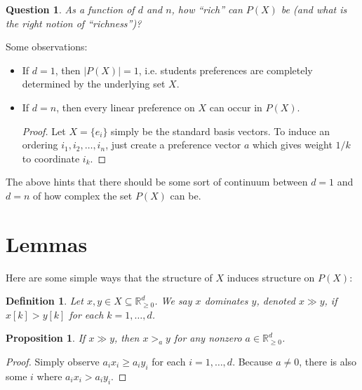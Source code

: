\documentclass[12pt]{article}
\newtheorem*{definition}{Definition}
\newtheorem*{question}{Question}
\newtheorem{proposition}[theorem]{Proposition}
\newcommand{\Rgz}{\mathbb{R}_{\ge 0}}
\newcommand{\ip}[2]{\left\langle{#1},{#2}\right\rangle}
\newcommand{\1}[1]{\mathds{1}[{#1}]}
\begin{document}


  \begin{question}
    As a function of $d$ and $n$, how ``rich'' can $P(X)$ be
    (and what is the right notion of ``richness'')?
  \end{question}

  Some observations:
  \begin{itemize}
    \item If $d=1$, then $|P(X)| = 1$, i.e. students preferences are completely
      determined by the underlying set $X$.
    \item If $d=n$, then every linear preference on $X$ can occur in $P(X)$.
      \begin{proof}
        Let $X = \{e_i\}$ simply be the standard basis vectors.
        To induce an ordering $i_1, i_2, \ldots, i_n$, just create a preference
        vector $a$ which gives weight $1/k$ to coordinate $i_k$.
      \end{proof}
  \end{itemize}
  The above hints that there should be some sort of continuum between $d=1$
  and $d=n$ of how complex the set $P(X)$ can be.

\section{Lemmas}

  Here are some simple ways that the structure of $X$ induces structure on $P(X)$:

  \begin{definition}
    Let $x,y\in X\subseteq \Rgz^d$.
    We say $x$ \emph{dominates} $y$, denoted $x\gg y$,
    if $x[k] > y[k]$ for each $k=1,\ldots,d$.
  \end{definition}
  \begin{proposition}
    If $x \gg y$, then $x >_a y$ for any nonzero $a\in \Rgz^d$.
  \end{proposition}
  \begin{proof}
    Simply observe $a_i x_i \ge a_i y_i$ for each $i=1,\ldots, d$.
    Because $a\ne 0$, there is also some $i$ where $a_i x_i > a_i y_i$.
  \end{proof}
\end{document}
